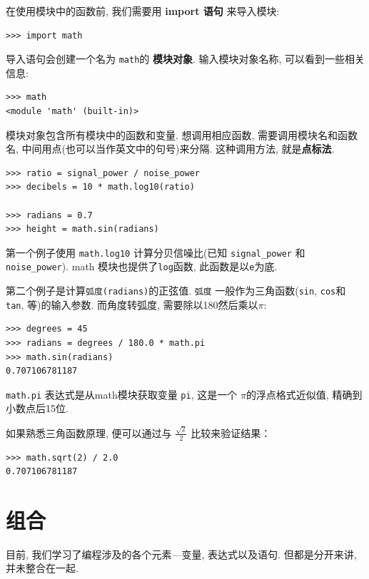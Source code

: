 \documentclass[10pt]{book}
\begin{document}
在使用模块中的函数前, 我们需要用 {\bf import 语句} 来导入模块:

\begin{verbatim}
>>> import math
\end{verbatim}
%
导入语句会创建一个名为 {\tt math}的 {\bf 模块对象}. 
输入模块对象名称, 可以看到一些相关信息:

\begin{verbatim}
>>> math
<module 'math' (built-in)>
\end{verbatim}
%
模块对象包含所有模块中的函数和变量. 想调用相应函数, 需要调用模块名和函数名, 
中间用点(也可以当作英文中的句号)来分隔. 这种调用方法, 就是{\bf 点标法}. 

\begin{verbatim}
>>> ratio = signal_power / noise_power
>>> decibels = 10 * math.log10(ratio)

>>> radians = 0.7
>>> height = math.sin(radians)
\end{verbatim}
%
第一个例子使用 \verb"math.log10" 计算分贝信噪比(已知 \verb"signal_power" 和
\verb"noise_power"). 
math 模块也提供了{\tt log}函数, 此函数是以{\tt e}为底. 

第二个例子是计算{\tt 弧度(radians)}的正弦值. 
{\tt 弧度} 一般作为三角函数({\tt sin}, {\tt cos}和 {\tt tan}, 等)的输入参数. 
而角度转弧度, 需要除以180然后乘以$\pi$:

\begin{verbatim}
>>> degrees = 45
>>> radians = degrees / 180.0 * math.pi
>>> math.sin(radians)
0.707106781187
\end{verbatim}
%
{\tt math.pi} 表达式是从math模块获取变量 {\tt pi}, 这是一个 $\pi$的浮点格式近似值, 
精确到小数点后15位. 

如果熟悉三角函数原理, 便可以通过与 $\frac{ \sqrt{2}} {2}$ 比较来验证结果：

\begin{verbatim}
>>> math.sqrt(2) / 2.0
0.707106781187
\end{verbatim}
%

\section{组合}

目前, 我们学习了编程涉及的各个元素---变量, 表达式以及语句. 
但都是分开来讲, 并未整合在一起. 
\end{document}
